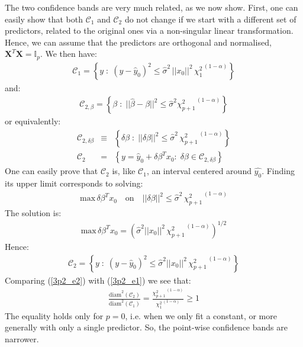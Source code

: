 The two confidence bands are very much related, as we now show. First, one can easily show that both $\mathcal{C}_1$ and $\mathcal{C}_2$
do not change if we start with a different set of predictors, related to the original ones via a non-singular linear
transformation. Hence, we can assume that the predictors are orthogonal and normalised, $ \mathbf{X}^T \mathbf{X} = \mathbb{I}_p$. We then have:
\begin{eqnarray}\label{3p2_e1}
\mathcal{C}_1 = \left\{ y\; : \; (y - \hat{y}_0)^2 \leq \hat{\sigma}^2\, ||x_0||^2\, {\chi_{1}^2} ^{\,(1- \alpha)} \right\}
\end{eqnarray}
and:
\begin{eqnarray*}
    \mathcal{C}_{2, \beta} = \left\{ \beta \; : \; || \hat{\beta} - \beta ||^2 \leq \hat{\sigma}^2 {\chi_{p + 1}^2} ^{\,(1- \alpha)} \right\}
\end{eqnarray*}
or equivalently:
\begin{eqnarray*}
    \mathcal{C}_{2, \delta \beta} & \equiv & \left\{ \delta \beta \; : \; || \delta \beta || ^2 \leq  \hat{\sigma}^2 \, {\chi_{p + 1}^2} ^{\,(1- \alpha)} \right\} \\
    \mathcal{C}_2 & = & \left\{ y = \hat{y}_0 + \delta \beta^T x_0: \; \delta \beta \in \mathcal{C}_{2, \delta \beta} \right\} 
\end{eqnarray*}
One can easily prove that $\mathcal{C}_2$ is, like $\mathcal{C}_1$, an interval centered around $\hat{y_0}$. Finding its upper limit corresponds to solving:
\begin{eqnarray*}
    \textrm{max} \, \delta \beta^T x_0 \quad \textrm{on} \quad || \delta \beta || ^2 \leq  \hat{\sigma}^2 \, {\chi_{p + 1}^2}^{\,(1- \alpha)}
\end{eqnarray*}
The solution is:
\begin{eqnarray*}
    \textrm{max} \, \delta \beta^T x_0 = \left(  \hat{\sigma}^2 ||x_0||^2 \, {\chi_{p + 1}^2}^{\,(1- \alpha)}  \right) ^{1/2}
\end{eqnarray*}
Hence:
\begin{eqnarray} \label{3p2_e2}
\mathcal{C}_2 = \left\{ y \; : \; (y - \hat{y}_0)^2 \leq \hat{\sigma}^2 ||x_0||^2 \, {\chi_{p + 1}^2}^{\,(1- \alpha)} \right\}
\end{eqnarray}
Comparing (\ref{3p2_e2}) with (\ref{3p2_e1}) we see that:
\begin{eqnarray}
\frac{\textrm{diam}^2(\mathcal{C}_2)}{\textrm{diam}^2(\mathcal{C}_1)} = \frac{{\chi_{p + 1}^2}^{\,(1- \alpha)}}{{\chi_{1}^2}^{\,(1- \alpha)}} \geq 1
\end{eqnarray}
The equality holds only for $p = 0$, i.e. when we only fit a constant, or more generally with only a single predictor. So, the point-wise confidence bands are narrower.

